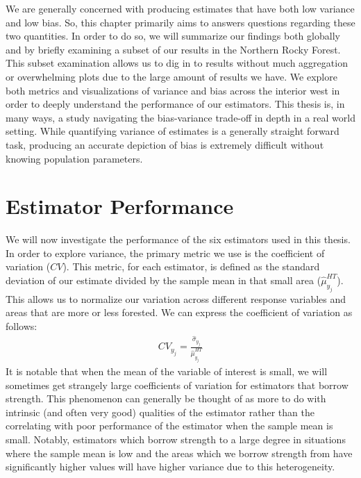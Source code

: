 \documentclass[12pt,twoside]{reedthesis}
\begin{document}
We are generally concerned with producing estimates that have both low variance and low bias. So, this chapter primarily aims to answers questions regarding these two quantities. In order to do so, we will summarize our findings both globally and by briefly examining a subset of our results in the Northern Rocky Forest. This subset examination allows us to dig in to results without much aggregation or overwhelming plots due to the large amount of results we have. We explore both metrics and visualizations of variance and bias across the interior west in order to deeply understand the performance of our estimators. This thesis is, in many ways, a study navigating the bias-variance trade-off in depth in a real world setting. While quantifying variance of estimates is a generally straight forward task, producing an accurate depiction of bias is extremely difficult without knowing population parameters.

\hypertarget{estimator-performance}{%
\section{Estimator Performance}\label{estimator-performance}}

We will now investigate the performance of the six estimators used in this thesis. In order to explore variance, the primary metric we use is the coefficient of variation (\(CV\)). This metric, for each estimator, is defined as the standard deviation of our estimate divided by the sample mean in that small area (\(\hat \mu_{y_j}^{HT}\)). This allows us to normalize our variation across different response variables and areas that are more or less forested. We can express the coefficient of variation as follows:
\begin{align}
CV_{y_j} = \frac{\hat\sigma_{y_j}}{\hat\mu_{y_j}^{HT}}
\end{align}
It is notable that when the mean of the variable of interest is small, we will sometimes get strangely large coefficients of variation for estimators that borrow strength. This phenomenon can generally be thought of as more to do with intrinsic (and often very good) qualities of the estimator rather than the correlating with poor performance of the estimator when the sample mean is small. Notably, estimators which borrow strength to a large degree in situations where the sample mean is low and the areas which we borrow strength from have significantly higher values will have higher variance due to this heterogeneity.
\end{document}
